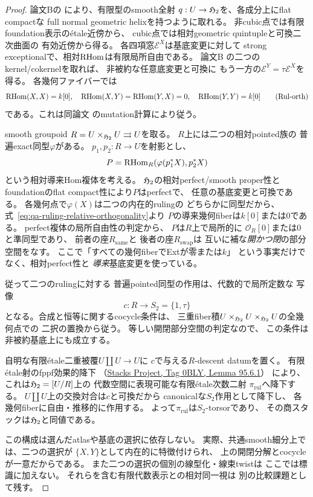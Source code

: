 \begin{proof}
論文Bの
\cite[\texttt{thm:global-h2-smooth-finite-type},
\texttt{thm:cubic-smooth-open},
\texttt{cor:noncubic-effective-smooth-neighborhood}]{QuadricModuli2026}
により、有限型のsmooth全射
$q:U\to\mathfrak H_2$を、各成分上にflat compactな
full normal geometric helixを持つように取れる。
非cubic点では有限foundation表示のétale近傍から、
cubic点では相対geometric quintupleと可換二次曲面の
有効近傍から得る。
各四項窓$\mathcal E^X$は基底変更に対して
strong exceptionalで、相対$\operatorname{RHom}$は有限局所自由である。
論文B
\cite[\texttt{prop:relative-ruling-involution},
\texttt{prop:ruling-involution-mutation}]{QuadricModuli2026}
の二つのkernel/cokernelを取れば、
非被約な任意底変更と可換に
もう一方の$\mathcal E^Y=\tau\mathcal E^X$を得る。
各幾何ファイバーでは
\[
 \operatorname{RHom}(X,X)=k[0],\quad
 \operatorname{RHom}(X,Y)=\operatorname{RHom}(Y,X)=0,\quad
 \operatorname{RHom}(Y,Y)=k[0]
 \tag{Rul-orth}\label{eq:qa-ruling-relative-orthogonality}
\]
である。これは同論文
\cite[\texttt{prop:ruling-involution-mutation}]{QuadricModuli2026}
のmutation計算により従う。

smooth groupoid $R=U\times_{\mathfrak H_2}U
\rightrightarrows U$を取る。
$R$上には二つの相対pointed族の
普遍exact同型$\varphi$がある。
$p_1,p_2:R\to U$を射影とし、
\[
 P=\operatorname{RHom}_R(\varphi(p_1^*X),p_2^*X)
\]
という相対導来Hom複体を考える。
$\mathfrak H_2$の相対perfect/smooth proper性と
foundationのflat compact性により$P$はperfectで、
任意の基底変更と可換である。
各幾何点で$\varphi(X)$は二つの内在的rulingの
どちらかに同型だから、
式~\eqref{eq:qa-ruling-relative-orthogonality}より
$P$の導来幾何fiberは$k[0]$または$0$である。
perfect複体の局所自由性の判定から、
$P$は$R$上で局所的に
$\mathcal O_R[0]$または$0$と準同型であり、
前者の座$R_{\mathrm{same}}$と
後者の座$R_{\mathrm{swap}}$は
互いに補な\emph{開かつ閉}の部分空間をなす。
ここで「すべての幾何fiberでExtが零または$k$」
という事実だけでなく、相対perfect性と
\emph{導来}基底変更を使っている。

従って二つのrulingに対する
普遍pointed同型の作用は、代数的で局所定数な
写像
\[
 c:R\longrightarrow S_2=\{1,\tau\}
\]
となる。合成と恒等に関するcocycle条件は、
三重fiber積$U\times_{\mathfrak H_2}U
\times_{\mathfrak H_2}U$の全幾何点での
二択の置換から従う。
等しい開閉部分空間の判定なので、
この条件は非被約基底上にも成立する。

自明な有限étale二重被覆$U\amalg U\to U$に
$c$で与える$R$-descent datumを置く。
有限étale射のfppf効果的降下
（\href{https://stacks.math.columbia.edu/tag/0BLY}
 {Stacks Project, Tag 0BLY, Lemma 95.6.1}）
により、これは$\mathfrak H_2=[U/R]$上の
代数空間に表現可能な有限étale次数二射
$\pi_{\mathrm{rul}}$へ降下する。
$U\amalg U$上の交換対合は$c$と可換だから
canonicalな$S_2$作用として降下し、
各幾何fiberに自由・推移的に作用する。
よって$\pi_{\mathrm{rul}}$は$S_2$-torsorであり、
その商スタックは$\mathfrak H_2$と同値である。

この構成は選んだatlasや基底の選択に依存しない。
実際、共通smooth細分上では、二つの選択が
$\{X,Y\}$として内在的に特徴付けられ、
上の開閉分解とcocycleが一意だからである。
また二つの選択の個別の線型化・線束twistは
ここでは標識に加えない。
それらを含む有限代数表示との相対同一視は
別の比較課題として残す。
\end{proof}

